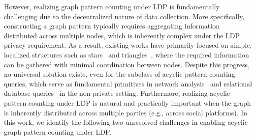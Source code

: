 




However, realizing graph pattern counting under LDP is fundamentally challenging due to the decentralized nature of data collection. 
More specifically, constructing a graph pattern typically requires aggregating information distributed across multiple nodes, which is inherently complex under the LDP privacy requirement. 
As a result, existing works have primarily focused on simple, localized structures such as stars~\cite{Imola2021} and triangles~\cite{ye2020towards, ye2020lf,Imola2021, Imola2022,eden2023triangle, he2025robust}, where the required information can be gathered with minimal coordination between nodes.
Despite this progress, no universal solution exists, even for the subclass of acyclic pattern counting queries, which serve as fundamental primitives in network analysis~\cite{milo2002network, itzkovitz2005subgraphs,katz1953new,liben2003link} and relational database queries~\cite{yannakakis1981algorithms, gottlob2001complexity} in the non-private setting.
Furthermore, realizing acyclic pattern counting under LDP is natural and practically important when the graph is inherently distributed across multiple parties (e.g., across social platforms).
In this work, we identify the following two unresolved challenges in enabling acyclic graph pattern counting under LDP.




